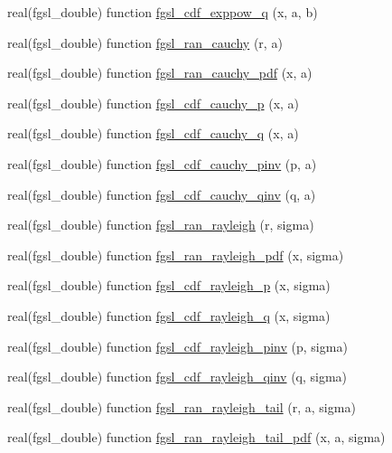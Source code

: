 \begin{DoxyCompactItemize}
\item 
real(fgsl\-\_\-double) function \hyperlink{rng_8finc_ae336d786addd5c9838e379079f2118e8}{fgsl\-\_\-cdf\-\_\-exppow\-\_\-q} (x, a, b)
\item 
real(fgsl\-\_\-double) function \hyperlink{rng_8finc_a5a546c09d9cae9ebedb9b07ea32efeda}{fgsl\-\_\-ran\-\_\-cauchy} (r, a)
\item 
real(fgsl\-\_\-double) function \hyperlink{rng_8finc_ace5b97b9a5d4c816d87a4266696fcdb5}{fgsl\-\_\-ran\-\_\-cauchy\-\_\-pdf} (x, a)
\item 
real(fgsl\-\_\-double) function \hyperlink{rng_8finc_a0e344d18cde233ed8002f084dde9eb60}{fgsl\-\_\-cdf\-\_\-cauchy\-\_\-p} (x, a)
\item 
real(fgsl\-\_\-double) function \hyperlink{rng_8finc_abcdb7697f3622398517eecdcbe437b28}{fgsl\-\_\-cdf\-\_\-cauchy\-\_\-q} (x, a)
\item 
real(fgsl\-\_\-double) function \hyperlink{rng_8finc_a074ae18be87299f8a671bc14c18fb12d}{fgsl\-\_\-cdf\-\_\-cauchy\-\_\-pinv} (p, a)
\item 
real(fgsl\-\_\-double) function \hyperlink{rng_8finc_a74774e42acfb80fb2fe4417ce410e760}{fgsl\-\_\-cdf\-\_\-cauchy\-\_\-qinv} (q, a)
\item 
real(fgsl\-\_\-double) function \hyperlink{rng_8finc_ab3b2b9a1275e0581f2f62f4bb974bba0}{fgsl\-\_\-ran\-\_\-rayleigh} (r, sigma)
\item 
real(fgsl\-\_\-double) function \hyperlink{rng_8finc_aeb1b678250b5a3437e2a5da86dc7027e}{fgsl\-\_\-ran\-\_\-rayleigh\-\_\-pdf} (x, sigma)
\item 
real(fgsl\-\_\-double) function \hyperlink{rng_8finc_a376b011d221203a9830ad4681bda4c53}{fgsl\-\_\-cdf\-\_\-rayleigh\-\_\-p} (x, sigma)
\item 
real(fgsl\-\_\-double) function \hyperlink{rng_8finc_ae07c15e9d38069dc78dd1fc10a3b37ab}{fgsl\-\_\-cdf\-\_\-rayleigh\-\_\-q} (x, sigma)
\item 
real(fgsl\-\_\-double) function \hyperlink{rng_8finc_ac0bf5e17a1114cf02a6d561aafdbebc0}{fgsl\-\_\-cdf\-\_\-rayleigh\-\_\-pinv} (p, sigma)
\item 
real(fgsl\-\_\-double) function \hyperlink{rng_8finc_a669f0c3f452b3f4779ee3d66eb292e6f}{fgsl\-\_\-cdf\-\_\-rayleigh\-\_\-qinv} (q, sigma)
\item 
real(fgsl\-\_\-double) function \hyperlink{rng_8finc_a251553996a7fe7909c52a740eaeb5a5c}{fgsl\-\_\-ran\-\_\-rayleigh\-\_\-tail} (r, a, sigma)
\item 
real(fgsl\-\_\-double) function \hyperlink{rng_8finc_a1d05f85a0832a708308a2022a295f8e2}{fgsl\-\_\-ran\-\_\-rayleigh\-\_\-tail\-\_\-pdf} (x, a, sigma)

\end{DoxyCompactItemize}
